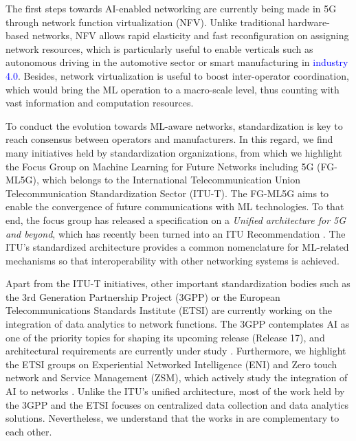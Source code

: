 \documentclass[journal]{IEEEtran}
\begin{document}
The first steps towards AI-enabled networking are currently being made in 5G through network function virtualization (NFV). Unlike traditional hardware-based networks, NFV allows rapid elasticity and fast reconfiguration on assigning network resources, which is particularly useful to enable verticals such as autonomous driving in the automotive sector or smart manufacturing in \textcolor{blue}{industry 4.0}. Besides, network virtualization is useful to boost inter-operator coordination, which would bring the ML operation to a macro-scale level, thus counting with vast information and computation resources. 

To conduct the evolution towards ML-aware networks, standardization is key to reach consensus between operators and manufacturers. In this regard, we find many initiatives held by standardization organizations, from which we highlight the Focus Group on Machine Learning for Future Networks including 5G (FG-ML5G), which belongs to the International Telecommunication Union Telecommunication Standardization Sector (ITU-T). The FG-ML5G aims to enable the convergence of future communications with ML technologies. To that end, the focus group has released a specification on a \emph{Unified architecture for 5G and beyond}, which has recently been turned into an ITU Recommendation \cite{itu2019architecture}. The ITU's standardized architecture provides a common nomenclature for ML-related mechanisms so that interoperability with other networking systems is achieved. 

Apart from the ITU-T initiatives, other important standardization bodies such as the 3rd Generation Partnership Project (3GPP) or the European Telecommunications Standards Institute (ETSI) are currently working on the integration of data analytics to network functions. The 3GPP contemplates AI as one of the priority topics for shaping its upcoming release (Release 17), and architectural requirements are currently under study \cite{3gpp2019study}. Furthermore, we highlight the ETSI groups on Experiential Networked Intelligence (ENI) and Zero touch network and Service Management (ZSM), which actively study the integration of AI to networks \cite{etsi2019architecture}. Unlike the ITU's unified architecture, most of the work held by the 3GPP and the ETSI focuses on centralized data collection and data analytics solutions. Nevertheless, we understand that the works in \cite{itu2019architecture, 3gpp2019study, etsi2019architecture} are complementary to each other.
\end{document}
